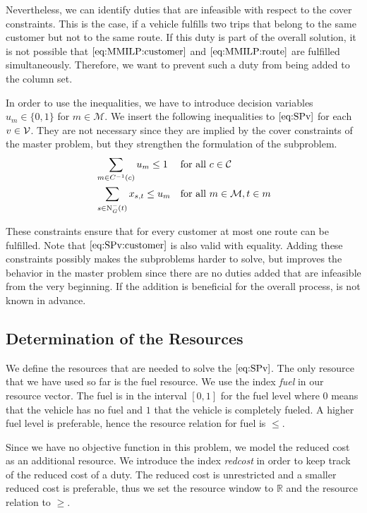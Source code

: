 Nevertheless, we can identify duties that are infeasible with respect to the cover constraints. This is the case, if a vehicle fulfills two trips that belong to the same customer but not to the same route. If this duty is part of the overall solution, it is not possible that $\eqref{eq:MMILP:customer}$ and $\eqref{eq:MMILP:route}$ are fulfilled simultaneously. Therefore, we want to prevent such a duty from being added to the column set.

In order to use the inequalities, we have to introduce decision variables $u_m\in\{0,1\}$ for $m\in\mathcal{M}$. We insert the following inequalities to $\eqref{eq:SPv}$ for each $v\in\mathcal{V}$. They are not necessary since they are implied by the cover constraints of the master problem, but they strengthen the formulation of the subproblem.
\begin{align}
	& \sum_{m\in C^{-1}(c)} u_m \leq 1 && \text{for all } c\in\mathcal{C} \label{eq:SPv:customer} \\
	& \sum_{s\in\operatorname{N}_G^-(t)} x_{s,t} \leq u_m && \text{for all } m\in\mathcal{M}, t\in m \label{eq:SPv:route}
\end{align}

These constraints ensure that for every customer at most one route can be fulfilled. Note that $\eqref{eq:SPv:customer}$ is also valid with equality. Adding these constraints possibly makes the subproblems harder to solve, but improves the behavior in the master problem since there are no duties added that are infeasible from the very beginning. If the addition is beneficial for the overall process, is not known in advance.


\subsection{Determination of the Resources}
\label{sec:resources}

We define the resources that are needed to solve the $\eqref{eq:SPv}$. The only resource that we have used so far is the fuel resource. We use the index \emph{fuel} in our resource vector. The fuel is in the interval $[0,1]$ for the fuel level where $0$ means that the vehicle has no fuel and $1$ that the vehicle is completely fueled. A higher fuel level is preferable, hence the resource relation for fuel is $\leq$.

Since we have no objective function in this problem, we model the reduced cost as an additional resource. We introduce the index \emph{redcost} in order to keep track of the reduced cost of a duty. The reduced cost is unrestricted and a smaller reduced cost is preferable, thus we set the resource window to $\mathbb{R}$ and the resource relation to $\geq$.

